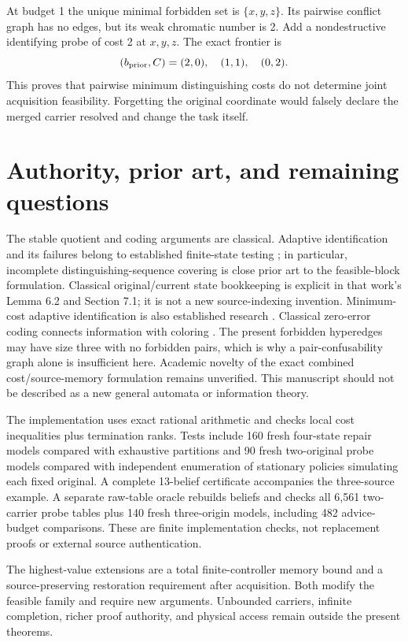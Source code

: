 \documentclass[11pt]{article}
\theoremstyle{definition}
\begin{document}
At budget 1 the unique minimal forbidden set is $\{x,y,z\}$. Its pairwise
conflict graph has no edges, but its weak chromatic number is 2. Add a
nondestructive identifying probe of cost 2 at $x,y,z$. The exact frontier is
\[
 (b_{\rm prior},C)=(2,0),\quad(1,1),\quad(0,2).
\]
This proves that pairwise minimum distinguishing costs do not determine
joint acquisition feasibility. Forgetting the original coordinate would
falsely declare the merged carrier resolved and change the task itself.



\section{Authority, prior art, and remaining questions}
The stable quotient and coding arguments are classical. Adaptive
identification and its failures belong to established finite-state testing
\cite{Gunicen,Hierons}; in particular, incomplete distinguishing-sequence
covering is close prior art to the feasible-block formulation. Classical
original/current state bookkeeping is explicit in that work's Lemma 6.2 and
Section 7.1; it is not a new source-indexing invention. Minimum-cost adaptive
identification is also established research \cite{TurkerCost}. Classical
zero-error coding connects information with coloring \cite{Witsenhausen}.
The present forbidden hyperedges may have size three with no forbidden
pairs, which is why a pair-confusability graph alone is insufficient here.
Academic novelty of the exact combined cost/source-memory formulation remains
unverified. This manuscript should not be described as a new general
automata or information theory.

The implementation uses exact rational arithmetic and checks local cost
inequalities plus termination ranks. Tests include 160 fresh four-state
repair models compared with exhaustive partitions and 90 fresh two-original
probe models compared with independent enumeration of stationary policies
simulating each fixed original. A complete 13-belief certificate accompanies
the three-source example. A separate raw-table oracle rebuilds beliefs and
checks all 6,561 two-carrier probe tables plus 140 fresh three-origin models,
including 482 advice-budget comparisons. These are finite implementation checks, not
replacement proofs or external source authentication.

The highest-value extensions are a total finite-controller memory bound and
a source-preserving restoration requirement after acquisition. Both modify
the feasible family and require new arguments. Unbounded carriers,
infinite completion, richer proof authority, and physical access remain
outside the present theorems.
\end{document}
